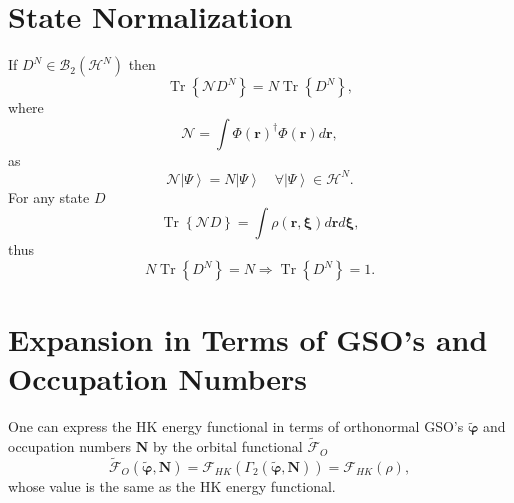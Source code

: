 \documentclass[aps,preprint]{revtex4}%
\begin{document}
\section{State Normalization \label{Normalization}}

If $D^{N}\in\mathcal{B}_{2}\left(  \mathcal{H}^{N}\right)  $ then
\begin{equation}
\operatorname{Tr}\left\{  \mathcal{N}D^{N}\right\}  =N\operatorname{Tr}%
\left\{  D^{N}\right\}  ,
\end{equation}
where
\begin{equation}
\mathcal{N}=\int\Phi\left(  \boldsymbol{r}\right)  ^{\dagger}\Phi\left(
\boldsymbol{r}\right)  d\boldsymbol{r,}%
\end{equation}
as
\begin{equation}
\mathcal{N}\left\vert \Psi\right\rangle =N\left\vert \Psi\right\rangle
\quad\forall\left\vert \Psi\right\rangle \in\mathcal{H}^{N}.
\end{equation}
For any state $D$
\begin{equation}
\operatorname{Tr}\left\{  \mathcal{N}D\right\}  =\int\rho\left(
\boldsymbol{r,\xi}\right)  d\boldsymbol{r}d\boldsymbol{\xi,}%
\end{equation}
thus
\begin{equation}
N\operatorname{Tr}\left\{  D^{N}\right\}  =N\Rightarrow\operatorname{Tr}%
\left\{  D^{N}\right\}  =1.
\end{equation}


\section{Expansion in Terms of GSO's and Occupation Numbers\label{GSO&Occ}}

One can express the HK energy functional in terms of orthonormal GSO's
$\boldsymbol{\tilde{\varphi}}$ and occupation numbers $\boldsymbol{N}$ by the
orbital functional $\mathcal{\tilde{F}}_{O}$
\begin{equation}
\mathcal{\tilde{F}}_{O}\left(  \boldsymbol{\tilde{\varphi},N}\right)
=\mathcal{F}_{HK}\left(  \Gamma_{2}\left(  \boldsymbol{\tilde{\varphi}%
,N}\right)  \right)  =\mathcal{F}_{HK}\left(  \rho\right)  ,
\end{equation}
whose value is the same as the HK energy functional.
\end{document}

